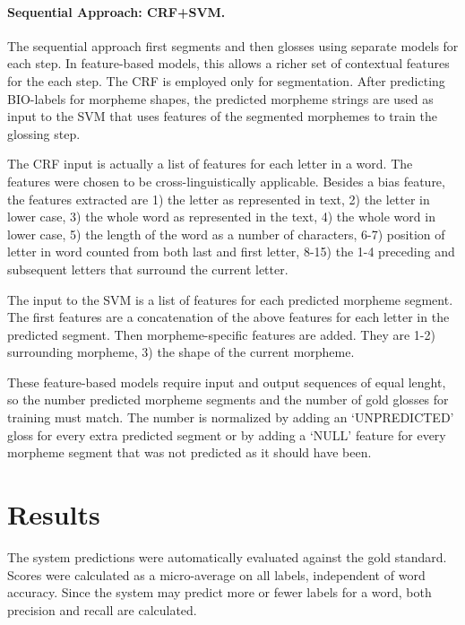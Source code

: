 \paragraph{Sequential Approach: CRF+SVM.}
The sequential approach first segments and then glosses using separate models for each step. In feature-based models, this allows a richer set of contextual features for the each step. 
The CRF is employed only for segmentation. After predicting BIO-labels for morpheme shapes, the predicted morpheme strings are used as input to the SVM that uses features of the segmented morphemes to train the glossing step. 

The CRF input is actually a list of features for each letter in a word. The features were chosen to be cross-linguistically applicable. Besides a bias feature, the features extracted are 1) the letter as represented in text, 2) the letter in lower case, 3) the whole word as represented in the text, 4) the whole word in lower case, 5) the length of the word as a number of characters, 6-7) position of letter in word counted from both last and first letter, 8-15) the 1-4 preceding and subsequent letters that surround the current letter.

The input to the SVM is a list of features for each predicted morpheme segment. The first features are a concatenation of the above features for each letter in the predicted segment. Then morpheme-specific features are added. They are 1-2) surrounding morpheme, 3) the shape of the current morpheme. 

These feature-based models require input and output sequences of equal lenght, so the number predicted morpheme segments and the number of gold glosses for training must match. The number is normalized by adding an `UNPREDICTED' gloss for every extra predicted segment or by adding a `NULL' feature for every morpheme segment that was not predicted as it should have been. 

\section{Results}
\label{sec:sgresults}

The system predictions were automatically evaluated against the gold standard. Scores were calculated as a micro-average on all labels, independent of word accuracy. Since the system may predict more or fewer labels for a word, both precision and recall are calculated. 


